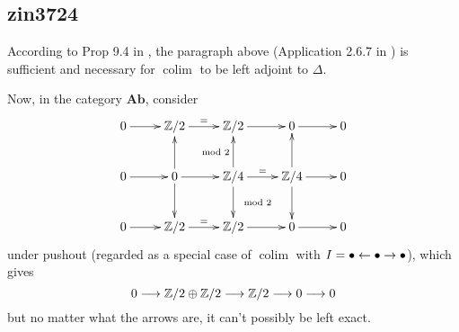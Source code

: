 \subsection{zin3724}
According to Prop 9.4 in \cite{Awodey_2010}, the paragraph above (Application 2.6.7 in \cite{Weibel_1995}) is sufficient and necessary for $\operatorname{colim}$ to be left adjoint to $\Delta$.

Now, in the category $\mathbf{Ab}$, consider
\[\begin{xy}
        \xymatrix{
    0 \ar@{->}[r] & \mathbb Z/2 \ar@{->}[r]^{=} & \mathbb Z/2 \ar@{->}[r] & 0 \ar@{->}[r] & 0 \\
    0 \ar@{->}[r] & 0 \ar@{->}[u] \ar@{->}[d] \ar@{->}[r] & \mathbb Z/4 \ar@{->}[d]^{\mod 2} \ar@{->}[u]^{\mod 2} \ar@{->}[r]^{=} & \mathbb Z/4 \ar@{->}[d] \ar@{->}[u] \ar@{->}[r] & 0 \\
    0 \ar@{->}[r] & \mathbb Z/2 \ar@{->}[r]^{=} & \mathbb Z/2 \ar@{->}[r] & 0 \ar@{->}[r] & 0
    }
    \end{xy}\]
under pushout (regarded as a special case of $\operatorname{colim}$ with $I=\bullet\leftarrow\bullet\rightarrow\bullet$), which gives
\[0\longrightarrow\mathbb{Z}/2\oplus\mathbb{Z}/2\longrightarrow\mathbb{Z}/2\longrightarrow0\longrightarrow0\]
but no matter what the arrows are, it can't possibly be left exact.